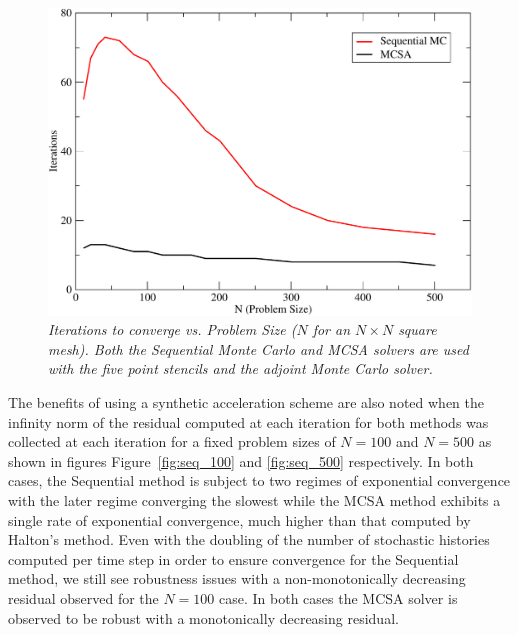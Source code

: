 \documentclass[preprint,12pt]{elsarticle}
\begin{document}
\begin{figure}[ht!]
  \centering
  \includegraphics[width=5in,clip]{seq_iterations.pdf}
  \caption{\sl Iterations to converge vs. Problem Size ($N$ for an $N
    \times N$ square mesh). Both the Sequential Monte Carlo and MCSA
    solvers are used with the five point stencils and the adjoint
    Monte Carlo solver.}
  \label{fig:seq_iterations}
\end{figure}

The benefits of using a synthetic acceleration scheme are also noted
when the infinity norm of the residual computed at each iteration for
both methods was collected at each iteration for a fixed problem sizes
of $N=100$ and $N=500$ as shown in figures Figure~\ref{fig:seq_100}
and \ref{fig:seq_500} respectively. In both cases, the Sequential
method is subject to two regimes of exponential convergence with the
later regime converging the slowest while the MCSA method exhibits a
single rate of exponential convergence, much higher than that computed
by Halton's method. Even with the doubling of the number of stochastic
histories computed per time step in order to ensure convergence for
the Sequential method, we still see robustness issues with a
non-monotonically decreasing residual observed for the $N=100$
case. In both cases the MCSA solver is observed to be robust with a
monotonically decreasing residual.
\end{document}
